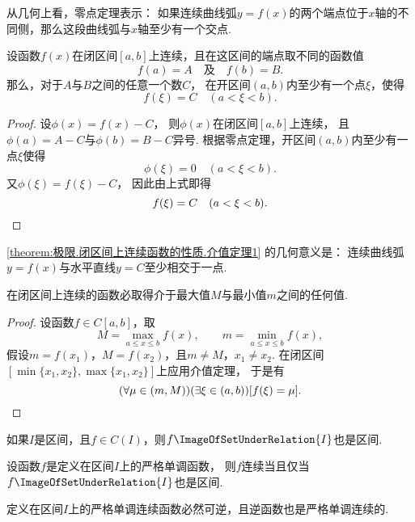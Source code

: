 从几何上看，零点定理表示：
如果连续曲线弧\(y = f(x)\)的两个端点位于\(x\)轴的不同侧，那么这段曲线弧与\(x\)轴至少有一个交点.

\begin{theorem}[介值定理]\label{theorem:极限.闭区间上连续函数的性质.介值定理1}
设函数\(f(x)\)在闭区间\([a,b]\)上连续，且在这区间的端点取不同的函数值\[
	f(a) = A
	\quad\text{及}\quad
	f(b) = B.
\]
那么，对于\(A\)与\(B\)之间的任意一个数\(C\)，
在开区间\((a,b)\)内至少有一个点\(\xi\)，使得\[
	f(\xi)=C
	\quad(a<\xi<b).
\]
\begin{proof}
设\(\phi(x)=f(x)-C\)，
则\(\phi(x)\)在闭区间\([a,b]\)上连续，
且\(\phi(a)=A-C\)与\(\phi(b)=B-C\)异号.
根据零点定理，开区间\((a,b)\)内至少有一点\(\xi\)使得\[
	\phi(\xi)=0
	\quad(a<\xi<b).
\]
又\(\phi(\xi)=f(\xi)-C\)，
因此由上式即得\[
	f(\xi)=C
	\quad(a<\xi<b).
	\qedhere
\]
\end{proof}
\end{theorem}
\cref{theorem:极限.闭区间上连续函数的性质.介值定理1} 的几何意义是：
连续曲线弧\(y=f(x)\)与水平直线\(y=C\)至少相交于一点.

\begin{corollary}\label{theorem:极限.闭区间上连续函数的性质.介值定理2}
在闭区间上连续的函数必取得介于最大值\(M\)与最小值\(m\)之间的任何值.
\begin{proof}
设函数\(f \in C[a,b]\)，取\[
	M=\max_{a \leq x \leq b} f(x), \qquad
	m=\min_{a \leq x \leq b} f(x),
\]
假设\(m=f(x_1)\)，\(M=f(x_2)\)，且\(m \neq M\)，\(x_1 \neq x_2\).
在闭区间\([\min\{x_1,x_2\},\max\{x_1,x_2\}]\)上应用介值定理，
于是有\[
	(\forall\mu\in(m,M))(\exists\xi\in(a,b))
	[f(\xi)=\mu].
	\qedhere
\]
\end{proof}
\end{corollary}

\begin{corollary}
如果\(I\)是区间，且\(f\in C(I)\)，则\(f\ImageOfSetUnderRelation{I}\)也是区间.
\end{corollary}

\begin{corollary}
设函数\(f\)是定义在区间\(I\)上的严格单调函数，
则\(f\)连续当且仅当\(f\ImageOfSetUnderRelation{I}\)也是区间.
\end{corollary}

\begin{corollary}
定义在区间\(I\)上的严格单调连续函数必然可逆，且逆函数也是严格单调连续的.
\end{corollary}

